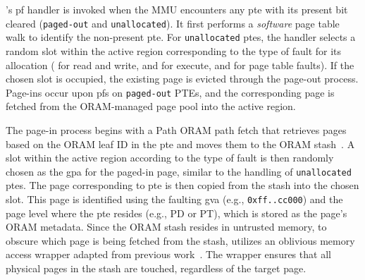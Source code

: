 \thename's \gls{pf} handler is invoked when the MMU encounters any \gls{pte} with its present bit cleared (\texttt{paged-out} and \texttt{unallocated}).
It first performs a \emph{software} page table walk to identify the non-present \gls{pte}.
For \texttt{unallocated} \glspl{pte},  the handler selects a random slot within the active region corresponding to the type of fault for its allocation ( for read and write, and  for execute, and  for page table faults).
If the chosen slot is occupied, the existing page is evicted through the page-out process.
Page-ins occur upon \glspl{pf} on \texttt{paged-out} PTEs, and the corresponding page is fetched from the ORAM-managed page pool into the active region.



\label{subsubsec:page-in}
The page-in process begins with a Path ORAM path fetch that retrieves pages based on the ORAM leaf ID in the \gls{pte} and moves them to the ORAM stash~\cite{stefanov2018path}.
A slot within the active region according to the type of fault is then randomly chosen as the \gls{gpa} for the paged-in page, similar to the handling of \texttt{unallocated} \glspl{pte}.
The page corresponding to \gls{pte} is then copied from the stash into the chosen slot.
This page is identified using the faulting \gls{gva} (e.g., \texttt{0xff..cc000}) and the page level where the \gls{pte} resides (e.g., PD or PT), which is stored as the page's ORAM metadata.
Since the ORAM stash resides in untrusted memory, to obscure which page is being fetched from the stash, \thename utilizes an oblivious memory access wrapper adapted from previous work~\cite{obelix}.
The wrapper ensures that all physical pages in the stash are touched, regardless of the target page.




